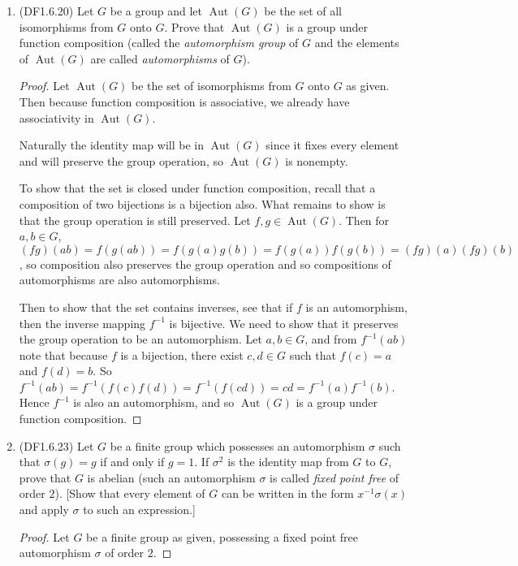 \documentclass[11pt]{article}
\DeclareMathOperator\Aut{Aut}
\begin{document}
\begin{enumerate}
\begin{proof}
      We can show that $\varphi_k$ is not injective by exhibiting an element (for each $k$) which is not $1$ which maps to $1$ under $\varphi_k$. So we try $z = e^{2\pi i\frac{1}{k}}$, and see that because $k>1$, $z\neq 1$. $z\in G$ because raising $z$ to some positive multiple of $k$, a positive integer, produces $1$. Then see that $\varphi_k(z) = z^k = \left(e^{2\pi i\frac{1}{k}}\right)^k = e^{2\pi i} = 1 = 1^k = \varphi_k(1)$. Hence $\varphi_k$ is not injective.
    \end{proof}
    
    \item (DF1.6.20) Let $G$ be a group and let $\Aut(G)$ be the set of all isomorphisms from $G$ onto $G$. Prove that $\Aut(G)$ is a group under function composition (called the \textit{automorphism group} of $G$ and the elements of $\Aut(G)$ are called \textit{automorphisms} of $G$). \begin{proof}
      Let $\Aut(G)$ be the set of isomorphisms from $G$ onto $G$ as given. Then because function composition is associative, we already have associativity in $\Aut(G)$.

      Naturally the identity map will be in $\Aut(G)$ since it fixes every element and will preserve the group operation, so $\Aut(G)$ is nonempty.
      
      To show that the set is closed under function composition, recall that a composition of two bijections is a bijection also. What remains to show is that the group operation is still preserved. Let $f,g\in \Aut(G)$. Then for $a,b\in G$, $(fg)(ab) = f(g(ab)) = f(g(a)g(b)) = f(g(a))f(g(b)) = (fg)(a)(fg)(b)$, so composition also preserves the group operation and so compositions of automorphisms are also automorphisms.
      
      Then to show that the set contains inverses, see that if $f$ is an automorphism, then the inverse mapping $f^{-1}$ is bijective. We need to show that it preserves the group operation to be an automorphism. Let $a,b\in G$, and from $f^{-1}(ab)$ note that because $f$ is a bijection, there exist $c,d\in G$ such that $f(c) = a$ and $f(d) = b$. So $f^{-1}(ab) = f^{-1}(f(c)f(d)) = f^{-1}(f(cd)) = cd = f^{-1}(a)f^{-1}(b)$. Hence $f^{-1}$ is also an automorphism, and so $\Aut(G)$ is a group under function composition.
    \end{proof}
    
    \item (DF1.6.23) Let $G$ be a finite group which possesses an automorphism $\sigma$ such that $\sigma(g) = g$ if and only if $g=1$. If $\sigma^2$ is the identity map from $G$ to $G$, prove that $G$ is abelian (such an automorphism $\sigma$ is called \textit{fixed point free} of order $2$). [Show that every element of $G$ can be written in the form $x^{-1}\sigma(x)$ and apply $\sigma$ to such an expression.] \begin{proof}
      Let $G$ be a finite group as given, possessing a fixed point free automorphism $\sigma$ of order $2$.


\end{proof}
\end{enumerate}
\end{document}
